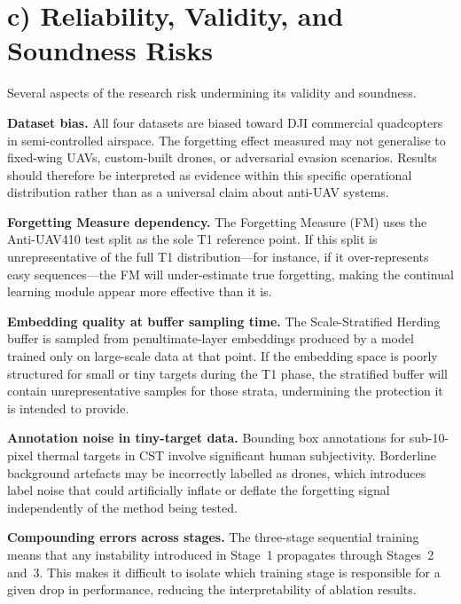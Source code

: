 \documentclass{thesisdesign}
\begin{document}
\section*{c) Reliability, Validity, and Soundness Risks}

Several aspects of the research risk undermining its validity and soundness.

\textbf{Dataset bias.} All four datasets are biased toward DJI commercial quadcopters in semi-controlled airspace. The forgetting effect measured may not generalise to fixed-wing UAVs, custom-built drones, or adversarial evasion scenarios. Results should therefore be interpreted as evidence within this specific operational distribution rather than as a universal claim about anti-UAV systems.

\textbf{Forgetting Measure dependency.} The Forgetting Measure (FM) uses the Anti-UAV410 test split as the sole T1 reference point. If this split is unrepresentative of the full T1 distribution---for instance, if it over-represents easy sequences---the FM will under-estimate true forgetting, making the continual learning module appear more effective than it is.

\textbf{Embedding quality at buffer sampling time.} The Scale-Stratified Herding buffer is sampled from penultimate-layer embeddings produced by a model trained only on large-scale data at that point. If the embedding space is poorly structured for small or tiny targets during the T1 phase, the stratified buffer will contain unrepresentative samples for those strata, undermining the protection it is intended to provide.

\textbf{Annotation noise in tiny-target data.} Bounding box annotations for sub-10-pixel thermal targets in CST involve significant human subjectivity. Borderline background artefacts may be incorrectly labelled as drones, which introduces label noise that could artificially inflate or deflate the forgetting signal independently of the method being tested.

\textbf{Compounding errors across stages.} The three-stage sequential training means that any instability introduced in Stage~1 propagates through Stages~2 and~3. This makes it difficult to isolate which training stage is responsible for a given drop in performance, reducing the interpretability of ablation results.



\end{document}
